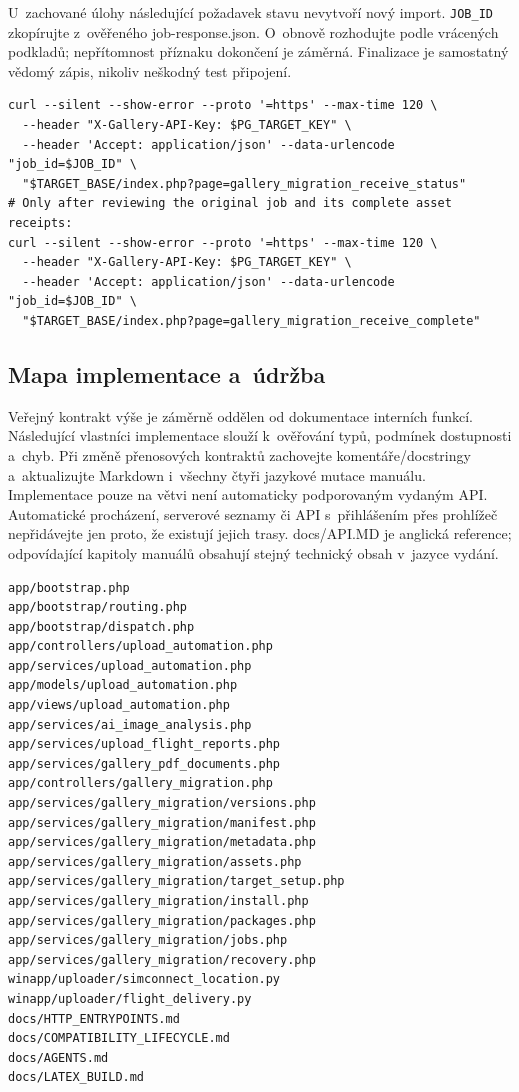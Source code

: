 \documentclass[11pt,a4paper]{article}
\newcommand{\codeword}[1]{\nolinkurl{#1}}
\begin{document}
U~zachované úlohy následující požadavek stavu nevytvoří nový import. \codeword{JOB_ID}
zkopírujte z~ověřeného job-response.json. O~obnově rozhodujte podle vrácených podkladů;
nepřítomnost příznaku dokončení je záměrná. Finalizace je samostatný vědomý zápis, nikoliv
neškodný test připojení.

\begin{lstlisting}[language={}]
curl --silent --show-error --proto '=https' --max-time 120 \
  --header "X-Gallery-API-Key: $PG_TARGET_KEY" \
  --header 'Accept: application/json' --data-urlencode "job_id=$JOB_ID" \
  "$TARGET_BASE/index.php?page=gallery_migration_receive_status"
# Only after reviewing the original job and its complete asset receipts:
curl --silent --show-error --proto '=https' --max-time 120 \
  --header "X-Gallery-API-Key: $PG_TARGET_KEY" \
  --header 'Accept: application/json' --data-urlencode "job_id=$JOB_ID" \
  "$TARGET_BASE/index.php?page=gallery_migration_receive_complete"
\end{lstlisting}

\subsection{\texorpdfstring{Mapa implementace a~údržba}{Mapa implementace a údržba}}

\label{api352:source-map}

Veřejný kontrakt výše je záměrně oddělen od dokumentace interních funkcí. Následující
vlastníci implementace slouží k~ověřování typů, podmínek dostupnosti a~chyb. Při změně
přenosových kontraktů zachovejte komentáře/docstringy a~aktualizujte Markdown i~všechny
čtyři jazykové mutace manuálu. Implementace pouze na větvi není automaticky podporovaným
vydaným API. Automatické procházení, serverové seznamy či API s~přihlášením přes prohlížeč
nepřidávejte jen proto, že existují jejich trasy. docs/API.MD je anglická reference;
odpovídající kapitoly manuálů obsahují stejný technický obsah v~jazyce vydání.

\begin{lstlisting}[language={}]
app/bootstrap.php
app/bootstrap/routing.php
app/bootstrap/dispatch.php
app/controllers/upload_automation.php
app/services/upload_automation.php
app/models/upload_automation.php
app/views/upload_automation.php
app/services/ai_image_analysis.php
app/services/upload_flight_reports.php
app/services/gallery_pdf_documents.php
app/controllers/gallery_migration.php
app/services/gallery_migration/versions.php
app/services/gallery_migration/manifest.php
app/services/gallery_migration/metadata.php
app/services/gallery_migration/assets.php
app/services/gallery_migration/target_setup.php
app/services/gallery_migration/install.php
app/services/gallery_migration/packages.php
app/services/gallery_migration/jobs.php
app/services/gallery_migration/recovery.php
winapp/uploader/simconnect_location.py
winapp/uploader/flight_delivery.py
docs/HTTP_ENTRYPOINTS.md
docs/COMPATIBILITY_LIFECYCLE.md
docs/AGENTS.md
docs/LATEX_BUILD.md
\end{lstlisting}
\end{document}
